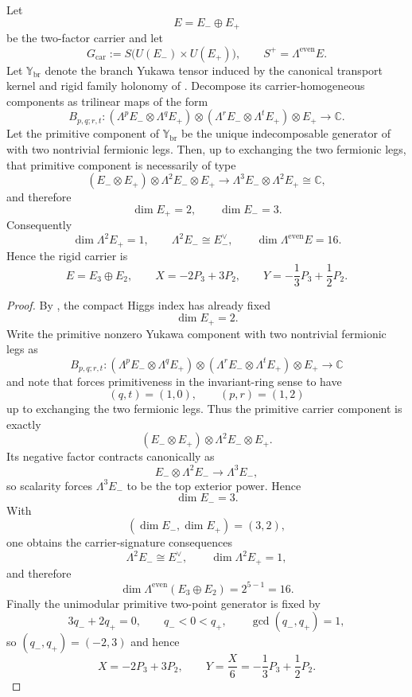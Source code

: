 \begin{theorem}
\label{thm:yukawa-forces-32}
Let
\[
E=E_-\oplus E_+
\]
be the two-factor carrier and let
\[
G_{\mathrm{car}}:=S\bigl(U(E_-)\times U(E_+)\bigr),
\qquad
S^+=\Lambda^{\mathrm{even}}E.
\]
Let $\mathbb Y_{\mathrm{br}}$ denote the branch Yukawa tensor induced by the canonical transport
kernel and rigid family holonomy of
. Decompose its carrier-homogeneous
components as trilinear maps of the form
\[
B_{p,q;r,t}:
(\Lambda^p E_-\otimes \Lambda^q E_+)
\otimes
(\Lambda^r E_-\otimes \Lambda^t E_+)
\otimes E_+
\longrightarrow
\mathbb C.
\]
Let the primitive component of $\mathbb Y_{\mathrm{br}}$ be the unique indecomposable generator of
 with two nontrivial
fermionic legs. Then, up to exchanging the two fermionic legs, that primitive component is
necessarily of type
\[
(E_-\otimes E_+) \otimes \Lambda^2 E_- \otimes E_+
\longrightarrow
\Lambda^3 E_-\otimes \Lambda^2 E_+\cong\mathbb C,
\]
and therefore
\[
\dim E_+=2,
\qquad
\dim E_-=3.
\]
Consequently
\[
\dim \Lambda^2 E_+=1,
\qquad
\Lambda^2 E_- \cong E_-^\vee,
\qquad
\dim \Lambda^{\mathrm{even}}E=16.
\]
Hence the rigid carrier is
\[
E=E_3\oplus E_2,
\qquad
X=-2P_3+3P_2,
\qquad
Y=-\frac13 P_3+\frac12 P_2.
\]
\end{theorem}

\begin{proof}
By , the compact Higgs index has already fixed
\[
\dim E_+=2.
\]
Write the primitive nonzero Yukawa component with two nontrivial fermionic legs as
\[
B_{p,q;r,t}:
(\Lambda^p E_-\otimes \Lambda^q E_+)
\otimes
(\Lambda^r E_-\otimes \Lambda^t E_+)
\otimes E_+
\longrightarrow
\mathbb C
\]
and note that  forces primitiveness in the invariant-ring
sense to have
\[
(q,t)=(1,0),
\qquad
(p,r)=(1,2)
\]
up to exchanging the two fermionic legs. Thus the primitive carrier component is exactly
\[
(E_-\otimes E_+) \otimes \Lambda^2 E_- \otimes E_+.
\]
Its negative factor contracts canonically as
\[
E_- \otimes \Lambda^2 E_- \longrightarrow \Lambda^3 E_-,
\]
so scalarity forces $\Lambda^3 E_-$ to be the top exterior power. Hence
\[
\dim E_-=3.
\]
With
\[
(\dim E_-,\dim E_+)=(3,2),
\]
one obtains the carrier-signature consequences
\[
\Lambda^2 E_- \cong E_-^\vee,
\qquad
\dim\Lambda^2 E_+=1,
\]
and therefore
\[
\dim \Lambda^{\mathrm{even}}(E_3\oplus E_2)=2^{5-1}=16.
\]
Finally the unimodular primitive two-point generator is fixed by
\[
3q_-+2q_+=0,
\qquad
q_-<0<q_+,
\qquad
\gcd(q_-,q_+)=1,
\]
so $(q_-,q_+) = (-2,3)$ and hence
\[
X=-2P_3+3P_2,
\qquad
Y=\frac{X}{6}=-\frac13 P_3+\frac12 P_2.
\]
\end{proof}


